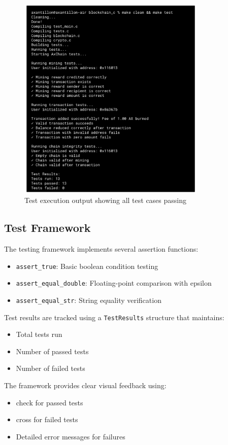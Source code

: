 \documentclass[12pt]{article}
\begin{document}
\begin{figure}[H]
    \centering
    \includegraphics[width=0.8\textwidth]{test_results.png}
    \caption{Test execution output showing all test cases passing}
\end{figure}

\subsection{Test Framework}
The testing framework implements several assertion functions:
\begin{itemize}
\item \texttt{assert\_true}: Basic boolean condition testing
\item \texttt{assert\_equal\_double}: Floating-point comparison with epsilon
\item \texttt{assert\_equal\_str}: String equality verification
\end{itemize}

Test results are tracked using a \texttt{TestResults} structure that maintains:
\begin{itemize}
\item Total tests run
\item Number of passed tests
\item Number of failed tests
\end{itemize}

The framework provides clear visual feedback using:
\begin{itemize}
\item check for passed tests
\item cross for failed tests
\item Detailed error messages for failures
\end{itemize}
\end{document}
